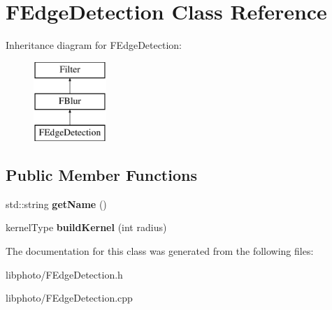 \hypertarget{classFEdgeDetection}{\section{F\-Edge\-Detection Class Reference}
\label{classFEdgeDetection}
}
Inheritance diagram for F\-Edge\-Detection\-:\begin{figure}[H]
\begin{center}
\leavevmode
\includegraphics[height=3.000000cm]{classFEdgeDetection}
\end{center}
\end{figure}
\subsection*{Public Member Functions}
\begin{DoxyCompactItemize}
\item 
\hypertarget{classFEdgeDetection_acdf7ec56e2f1f5010b84ebcd66a958f3}{std\-::string {\bfseries get\-Name} ()}\label{classFEdgeDetection_acdf7ec56e2f1f5010b84ebcd66a958f3}

\item 
\hypertarget{classFEdgeDetection_a58c541bf60eb4e21bdb656bdad5f8c65}{kernel\-Type {\bfseries build\-Kernel} (int radius)}\label{classFEdgeDetection_a58c541bf60eb4e21bdb656bdad5f8c65}

\end{DoxyCompactItemize}


The documentation for this class was generated from the following files\-:\begin{DoxyCompactItemize}
\item 
libphoto/F\-Edge\-Detection.\-h\item 
libphoto/F\-Edge\-Detection.\-cpp\end{DoxyCompactItemize}
